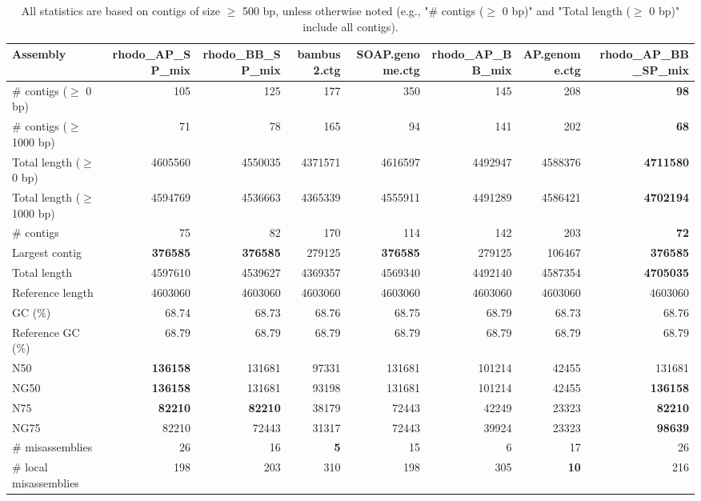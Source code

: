 \documentclass[12pt,a4paper]{article}
\begin{document}
\begin{table}[ht]
\begin{center}
\caption{All statistics are based on contigs of size $\geq$ 500 bp, unless otherwise noted (e.g., "\# contigs ($\geq$ 0 bp)" and "Total length ($\geq$ 0 bp)" include all contigs).}
\begin{tabular}{|l*{7}{|r}|}
\hline
Assembly & rhodo\_AP\_SP\_mix & rhodo\_BB\_SP\_mix & bambus2.ctg & SOAP.genome.ctg & rhodo\_AP\_BB\_mix & AP.genome.ctg & rhodo\_AP\_BB\_SP\_mix \\ \hline
\# contigs ($\geq$ 0 bp) & 105 & 125 & 177 & 350 & 145 & 208 & {\bf 98} \\ \hline
\# contigs ($\geq$ 1000 bp) & 71 & 78 & 165 & 94 & 141 & 202 & {\bf 68} \\ \hline
Total length ($\geq$ 0 bp) & 4605560 & 4550035 & 4371571 & 4616597 & 4492947 & 4588376 & {\bf 4711580} \\ \hline
Total length ($\geq$ 1000 bp) & 4594769 & 4536663 & 4365339 & 4555911 & 4491289 & 4586421 & {\bf 4702194} \\ \hline
\# contigs & 75 & 82 & 170 & 114 & 142 & 203 & {\bf 72} \\ \hline
Largest contig & {\bf 376585} & {\bf 376585} & 279125 & {\bf 376585} & 279125 & 106467 & {\bf 376585} \\ \hline
Total length & 4597610 & 4539627 & 4369357 & 4569340 & 4492140 & 4587354 & {\bf 4705035} \\ \hline
Reference length & 4603060 & 4603060 & 4603060 & 4603060 & 4603060 & 4603060 & 4603060 \\ \hline
GC (\%) & 68.74 & 68.73 & 68.76 & 68.75 & 68.79 & 68.73 & 68.76 \\ \hline
Reference GC (\%) & 68.79 & 68.79 & 68.79 & 68.79 & 68.79 & 68.79 & 68.79 \\ \hline
N50 & {\bf 136158} & 131681 & 97331 & 131681 & 101214 & 42455 & 131681 \\ \hline
NG50 & {\bf 136158} & 131681 & 93198 & 131681 & 101214 & 42455 & {\bf 136158} \\ \hline
N75 & {\bf 82210} & {\bf 82210} & 38179 & 72443 & 42249 & 23323 & {\bf 82210} \\ \hline
NG75 & 82210 & 72443 & 31317 & 72443 & 39924 & 23323 & {\bf 98639} \\ \hline
\# misassemblies & 26 & 16 & {\bf 5} & 15 & 6 & 17 & 26 \\ \hline
\# local misassemblies & 198 & 203 & 310 & 198 & 305 & {\bf 10} & 216 \\ \hline

\end{tabular}
\end{center}
\end{table}
\end{document}
